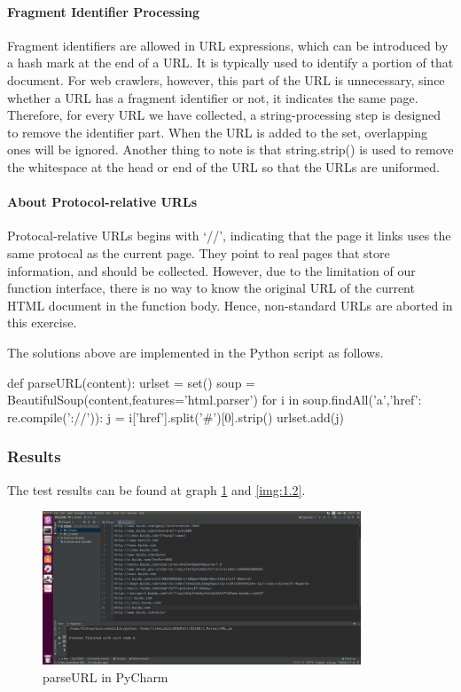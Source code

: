 \documentclass{article}
\begin{document}
\paragraph{Fragment Identifier Processing} Fragment identifiers are allowed in URL expressions, which can be introduced by a hash mark at the end of a URL. It is typically used to identify a portion of that document. For web crawlers, however, this part of the URL is unnecessary, since whether a URL has a fragment identifier or not, it indicates the same page. Therefore, for every URL we have collected, a string-processing step is designed to remove the identifier part. When the URL is added to the set, overlapping ones will be ignored. Another thing to note is that string.strip() is used to remove the whitespace at the head or end of the URL so that the URLs are uniformed.

\paragraph{About Protocol-relative URLs} Protocal-relative URLs begins with `//', indicating that the page it links uses the same protocal as the current page. They point to real pages that store information, and should be collected. However, due to the limitation of our function interface, there is no way to know the original URL of the current HTML document in the function body. Hence, non-standard URLs are aborted in this exercise.

The solutions above are implemented in the Python script as follows.
\begin{python}
def parseURL(content):
    urlset = set()
    soup = BeautifulSoup(content,features='html.parser')
    for i in soup.findAll('a',{'href': re.compile('://')}):
        j = i['href'].split('#')[0].strip()
        urlset.add(j)
\end{python}

\subsubsection{Results}
The test results can be found at graph \ref{img:1.1} and \ref{img:1.2}.

\begin{figure}[htbp]
\centering
\includegraphics[width=9.5cm]{img/test1_1.png}
\caption{parseURL in PyCharm}
\label{img:1.1}
\end{figure}
\end{document}
